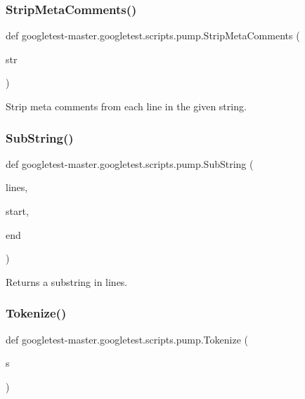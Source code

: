 \subsubsection{\texorpdfstring{StripMetaComments()}{StripMetaComments()}}
{\footnotesize\ttfamily def googletest-\/master.\+googletest.\+scripts.\+pump.\+Strip\+Meta\+Comments (\begin{DoxyParamCaption}\item[{}]{str }\end{DoxyParamCaption})}

\begin{DoxyVerb}Strip meta comments from each line in the given string.\end{DoxyVerb}
 \mbox{\label{namespacegoogletest-master_1_1googletest_1_1scripts_1_1pump_a340fe1bba7ee6be6192dd247c5a47473}} 
\subsubsection{\texorpdfstring{SubString()}{SubString()}}
{\footnotesize\ttfamily def googletest-\/master.\+googletest.\+scripts.\+pump.\+Sub\+String (\begin{DoxyParamCaption}\item[{}]{lines,  }\item[{}]{start,  }\item[{}]{end }\end{DoxyParamCaption})}

\begin{DoxyVerb}Returns a substring in lines.\end{DoxyVerb}
 \mbox{\label{namespacegoogletest-master_1_1googletest_1_1scripts_1_1pump_a52092664233b262eb52dc977f503b5a3}} 
\subsubsection{\texorpdfstring{Tokenize()}{Tokenize()}}
{\footnotesize\ttfamily def googletest-\/master.\+googletest.\+scripts.\+pump.\+Tokenize (\begin{DoxyParamCaption}\item[{}]{s }\end{DoxyParamCaption})}

